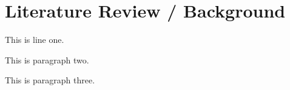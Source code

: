 \documentclass[12pt]{article}
\title{\vspace{-7cm}}
\author{}
\date{}
\begin{document}
\maketitle

\section{Literature Review / Background}

This is line one. %

\noindent
This is paragraph two. %

\noindent
This is paragraph three.

\clearpage
\end{document}
